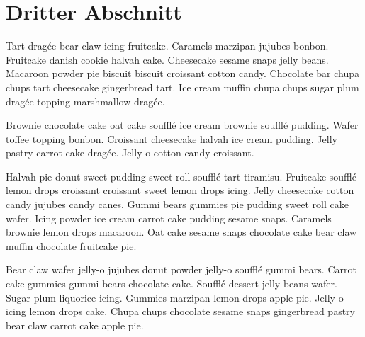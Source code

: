 \section{Dritter Abschnitt}

Tart dragée bear claw icing fruitcake. Caramels marzipan jujubes bonbon. Fruitcake danish cookie halvah cake. Cheesecake sesame snaps jelly beans. Macaroon powder pie biscuit biscuit croissant cotton candy. Chocolate bar chupa chups tart cheesecake gingerbread tart. Ice cream muffin chupa chups sugar plum dragée topping marshmallow dragée. 

Brownie chocolate cake oat cake soufflé ice cream brownie soufflé pudding. Wafer toffee topping bonbon. Croissant cheesecake halvah ice cream pudding. Jelly pastry carrot cake dragée. Jelly-o cotton candy croissant.

Halvah pie donut sweet pudding sweet roll soufflé tart tiramisu. Fruitcake soufflé lemon drops croissant croissant sweet lemon drops icing. Jelly cheesecake cotton candy jujubes candy canes. Gummi bears gummies pie pudding sweet roll cake wafer. Icing powder ice cream carrot cake pudding sesame snaps. Caramels brownie lemon drops macaroon. Oat cake sesame snaps chocolate cake bear claw muffin chocolate fruitcake pie.

Bear claw wafer jelly-o jujubes donut powder jelly-o soufflé gummi bears. Carrot cake gummies gummi bears chocolate cake. Soufflé dessert jelly beans wafer. Sugar plum liquorice icing. Gummies marzipan lemon drops apple pie. Jelly-o icing lemon drops cake. Chupa chups chocolate sesame snaps gingerbread pastry bear claw carrot cake apple pie.